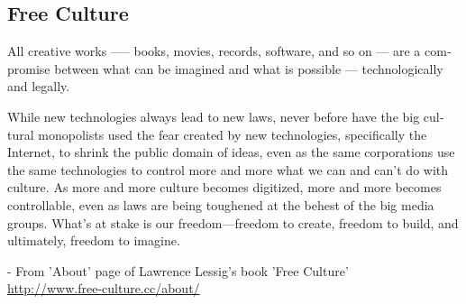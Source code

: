 \newpage
\begin{english}
\section*{Free Culture}
All creative works --— books, movies, records, software, and so on --- are a compromise between what can be imagined and what is possible --- technologically and legally.

While new technologies always lead to new laws, never before have the big cultural monopolists used the fear created by new technologies, specifically the Internet, to shrink the public domain of ideas, even as the same corporations use the same technologies to control more and more what we can and can’t do with culture. As more and more culture becomes digitized, more and more becomes controllable, even as laws are being toughened at the behest of the big media groups. What’s at stake is our freedom—freedom to create, freedom to build, and ultimately, freedom to imagine.
\begin{flushright}- From 'About' page of Lawrence Lessig's book 'Free Culture'\\
\url{http://www.free-culture.cc/about/}\end{flushright}
\end{english}
